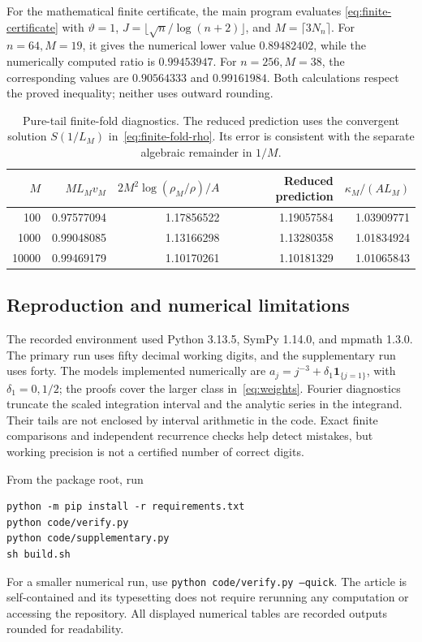 \documentclass[11pt,a4paper]{article}
\numberwithin{equation}{section}
\theoremstyle{definition}
\theoremstyle{remark}
\begin{document}
For the mathematical finite certificate, the main program evaluates
\eqref{eq:finite-certificate} with \(\vartheta=1\),
\(J=\lfloor\sqrt n/\log(n+2)\rfloor\), and \(M=\lceil3N_n\rceil\).
For \(n=64,M=19\), it gives the numerical lower value \(0.89482402\),
while the numerically computed ratio is \(0.99453947\). For
\(n=256,M=38\), the corresponding values are \(0.90564333\) and
\(0.99161984\). Both calculations respect the proved inequality; neither
uses outward rounding.

\begin{table}[htbp]
\centering\small
\begin{tabular}{@{}rrrrr@{}}
\toprule
\(M\)&\(ML_Mv_M\)&\(2M^2\log(\rho_M/\rho)/A\)&Reduced prediction&\(\kappa_M/(AL_M)\)\\
\midrule
100&0.97577094&1.17856522&1.19057584&1.03909771\\
1000&0.99048085&1.13166298&1.13280358&1.01834924\\
10000&0.99469179&1.10170261&1.10181329&1.01065843\\
\bottomrule
\end{tabular}
\caption{Pure-tail finite-fold diagnostics. The reduced prediction uses the
convergent solution \(S(1/L_M)\) in~\eqref{eq:finite-fold-rho}. Its error
is consistent with the separate algebraic remainder in \(1/M\).}
\label{tab:fold}
\end{table}

\subsection{Reproduction and numerical limitations}
The recorded environment used Python 3.13.5, SymPy 1.14.0, and mpmath 1.3.0.
The primary run uses fifty decimal working digits, and the supplementary
run uses forty. The models implemented numerically are
\(a_j=j^{-3}+\delta_1\mathbf1_{\{j=1\}}\), with
\(\delta_1=0,1/2\); the proofs cover the larger class in~\eqref{eq:weights}.
Fourier diagnostics truncate the scaled integration interval and the
analytic series in the integrand. Their tails are not enclosed by interval
arithmetic in the code. Exact finite comparisons and independent recurrence
checks help detect mistakes, but working precision is not a certified number
of correct digits.

From the package root, run
\begin{verbatim}
python -m pip install -r requirements.txt
python code/verify.py
python code/supplementary.py
sh build.sh
\end{verbatim}
For a smaller numerical run, use \texttt{python code/verify.py --quick}.
The article is self-contained and its typesetting does not require rerunning
any computation or accessing the repository. All displayed numerical tables
are recorded outputs rounded for readability.
\end{document}
